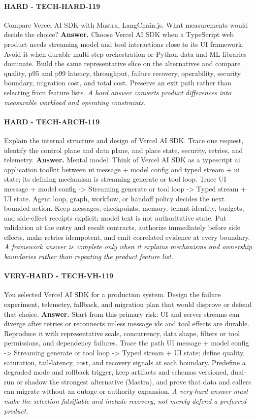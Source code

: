 \paragraph{HARD - TECH-HARD-119} Compare Vercel AI SDK with Mastra, LangChain.js. What measurements would decide the choice?
\textbf{Answer.} Choose Vercel AI SDK when a TypeScript web product needs streaming model and tool interactions close to its UI framework. Avoid it when durable multi-step orchestration or Python data and ML libraries dominate. Build the same representative slice on the alternatives and compare quality, p95 and p99 latency, throughput, failure recovery, operability, security boundary, migration cost, and total cost. Preserve an exit path rather than selecting from feature lists.
\textit{A hard answer converts product differences into measurable workload and operating constraints.}
\paragraph{HARD - TECH-ARCH-119} Explain the internal structure and design of Vercel AI SDK. Trace one request, identify the control plane and data plane, and place state, security, retries, and telemetry.
\textbf{Answer.} Mental model: Think of Vercel AI SDK as a typescript ai application toolkit between ui message + model config and typed stream + ui state; its defining mechanism is streaming generate or tool loop. Trace UI message + model config -> Streaming generate or tool loop -> Typed stream + UI state. Agent loop, graph, workflow, or handoff policy decides the next bounded action. Keep messages, checkpoints, memory, tenant identity, budgets, and side-effect receipts explicit; model text is not authoritative state. Put validation at the entry and result contracts, authorize immediately before side effects, make retries idempotent, and emit correlated evidence at every boundary.
\textit{A framework answer is complete only when it explains mechanisms and ownership boundaries rather than repeating the product feature list.}
\paragraph{VERY-HARD - TECH-VH-119} You selected Vercel AI SDK for a production system. Design the failure experiment, telemetry, fallback, and migration plan that would disprove or defend that choice.
\textbf{Answer.} Start from this primary risk: UI and server streams can diverge after retries or reconnects unless message ids and tool effects are durable. Reproduce it with representative scale, concurrency, data shape, filters or tool permissions, and dependency failures. Trace the path UI message + model config -> Streaming generate or tool loop -> Typed stream + UI state; define quality, saturation, tail-latency, cost, and recovery signals at each boundary. Predefine a degraded mode and rollback trigger, keep artifacts and schemas versioned, dual-run or shadow the strongest alternative (Mastra), and prove that data and callers can migrate without an outage or authority expansion.
\textit{A very-hard answer must make the selection falsifiable and include recovery, not merely defend a preferred product.}
